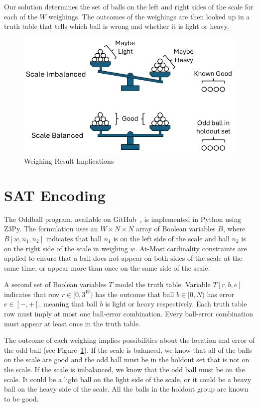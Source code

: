 \documentclass[conference]{IEEEtran}
\begin{document}
Our solution determines the set of balls on the left and right sides of the scale for each of the $W$ weighings.
The outcomes of the weighings are then looked up in a truth table that tells which ball is wrong and whether it is light or heavy.

\begin{figure}[!t]
\centerline{\includegraphics[width=\linewidth]{scale.png}}
\caption{Weighing Result Implications}
\label{scale}
\end{figure}

\section{SAT Encoding}

The Oddball program, available on GitHub~\cite{b1}, is implemented in Python using Z3Py.
The formulation uses an $W \times N \times N$ array of Boolean variables $B$,
where $B[w, n_1, n_2]$ indicates that ball $n_1$ is on the left side of the scale and ball $n_2$ is on the right side of the scale
in weighing $w$.
At\nobreakdash-Most cardinality constraints are applied to ensure that a ball does not appear on both sides of the scale
at the same time, or appear more than once on the same side of the scale.

A second set of Boolean variables $T$ model the truth table.
Variable $T[r, b, e]$ indicates that row $r \in [0, 3^W)$ has the outcome that ball $b \in [0, N)$ has error $e \in [-, +]$,
meaning that ball $b$ is light or heavy respectively.
Each truth table row must imply at most one ball-error combination.
Every ball-error combination must appear at least once in the truth table.

The outcome of each weighing implies possibilities about the location and error of the odd ball (see Figure~\ref{scale}).
If the scale is balanced, we know that all of the balls on the scale are good and the odd ball must be in the holdout set
that is not on the scale.
If the scale is imbalanced, we know that the odd ball must be on the scale.
It could be a light ball on the light side of the scale, or it could be a heavy ball on the heavy side of the scale.
All the balls in the holdout group are known to be good.
\end{document}
